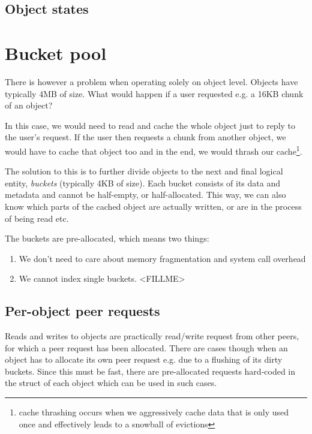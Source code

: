 
\subsection{Object states}


\section{Bucket pool}

There is however a problem when operating solely on object level. Objects have 
typically 4MB of size. What would happen if a user requested e.g. a 16KB chunk 
of an object?

In this case, we would need to read and cache the whole object just to reply to 
the user's request. If the user then requests a chunk from another object, we 
would have to cache that object too and in the end, we would thrash our 
cache\footnote{cache thrashing occurs when we aggressively cache data that is 
	only used once and effectively leads to a snowball of evictions}.

The solution to this is to further divide objects to the next and final logical 
entity, \emph{buckets} (typically 4KB of size). Each bucket consists of its data 
and metadata and cannot be half-empty, or half-allocated. This way, we can also 
know which parts of the cached object are actually written, or are in the 
process of being read etc.

The buckets are pre-allocated, which means two things:

\begin{enumerate}
	\item We don't need to care about memory fragmentation and system call 
		overhead
	\item We cannot index single buckets. <FILLME>
\end{enumerate}

\subsection{Per-object peer requests}

Reads and writes to objects are practically read/write request from other
peers, for which a peer request has been allocated. There are cases though
when an object has to allocate its own peer request e.g. due to a flushing of
its dirty buckets. Since this must be fast, there are pre-allocated requests
hard-coded in the struct of each object which can be used in such cases.

